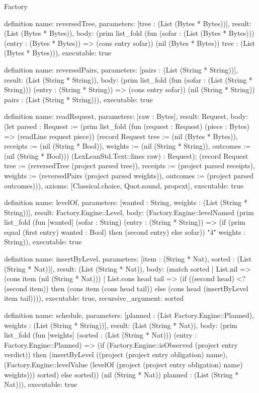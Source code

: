 \begin{lexlean}{Factory}
\begin{semanticmodule}
definition{
  name: reversedTree,
  parameters: [tree : (List (Bytes * Bytes))],
  result: (List (Bytes * Bytes)),
  body: (prim list_fold (fun (sofar : (List (Bytes * Bytes))) (entry : (Bytes * Bytes)) => (cons entry sofar)) (nil (Bytes * Bytes)) tree : (List (Bytes * Bytes))),
  executable: true
}

definition{
  name: reversedPairs,
  parameters: [pairs : (List (String * String))],
  result: (List (String * String)),
  body: (prim list_fold (fun (sofar : (List (String * String))) (entry : (String * String)) => (cons entry sofar)) (nil (String * String)) pairs : (List (String * String))),
  executable: true
}

definition{
  name: readRequest,
  parameters: [raw : Bytes],
  result: Request,
  body: (let parsed : Request := (prim list_fold (fun (request : Request) (piece : Bytes) => (readLine request piece)) (record Request {tree := (nil (Bytes * Bytes)), receipts := (nil (String * Bool)), weights := (nil (String * String)), outcomes := (nil (String * Bool))}) (LexLeanStd.Text::lines raw) : Request); (record Request {tree := (reversedTree (project parsed tree)), receipts := (project parsed receipts), weights := (reversedPairs (project parsed weights)), outcomes := (project parsed outcomes)})),
  axioms: [Classical.choice, Quot.sound, propext],
  executable: true
}

definition{
  name: levelOf,
  parameters: [wanted : String, weights : (List (String * String))],
  result: Factory.Engine::Level,
  body: (Factory.Engine::levelNamed (prim list_fold (fun [wanted] (sofar : String) (entry : (String * String)) => (if (prim equal (first entry) wanted : Bool) then (second entry) else sofar)) "4" weights : String)),
  executable: true
}

definition{
  name: insertByLevel,
  parameters: [item : (String * Nat), sorted : (List (String * Nat))],
  result: (List (String * Nat)),
  body: (match sorted
    | List.nil => (cons item (nil (String * Nat)))
    | List.cons head tail => (if ((second head) <? (second item)) then (cons item (cons head tail)) else (cons head (insertByLevel item tail)))),
  executable: true,
  recursive_argument: sorted
}

definition{
  name: schedule,
  parameters: [planned : (List Factory.Engine::Planned), weights : (List (String * String))],
  result: (List (String * Nat)),
  body: (prim list_fold (fun [weights] (sorted : (List (String * Nat))) (entry : Factory.Engine::Planned) => (if (Factory.Engine::isObserved (project entry verdict)) then (insertByLevel ((project (project entry obligation) name), (Factory.Engine::levelValue (levelOf (project (project entry obligation) name) weights))) sorted) else sorted)) (nil (String * Nat)) planned : (List (String * Nat))),
  executable: true
}


\end{semanticmodule}
\end{lexlean}

